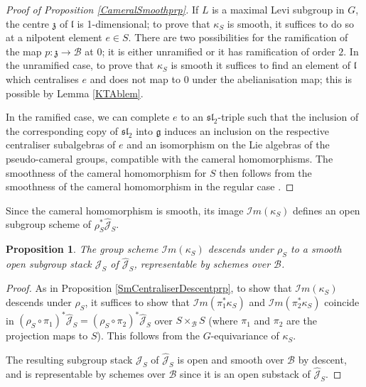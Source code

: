 \documentclass{amsart}
\newtheorem{proposition}[theorem]{Proposition}
\theoremstyle{remark}
\numberwithin{theorem}{section}
\numberwithin{equation}{section}
\begin{document}
\begin{proof}[Proof of Proposition \ref{CameralSmoothprp}]
If $L$ is a maximal Levi subgroup in $G$, the centre $\mathfrak{z}$ of $\mathfrak{l}$ is 1-dimensional; to prove that $\kappa_S$ is smooth, it suffices to do so at a nilpotent element $e \in S$. There are two possibilities for the ramification of the map $p:\mathfrak{z} \rightarrow \mathcal B$ at $0$; it is either unramified or it has ramification of order $2$. In the unramified case, to prove that $\kappa_S$ is smooth it suffices to find an element of $\mathfrak{l}$ which centralises $e$ and does not map to $0$ under the abelianisation map; this is possible by Lemma \ref{KTAblem}. 

In the ramified case, we can complete $e$ to an $\mathfrak{sl}_2$-triple such that the inclusion of the corresponding copy of $\mathfrak{sl}_2$ into $\mathfrak{g}$ induces an inclusion on the respective centraliser subalgebras of $e$ and an isomorphism on the Lie algebras of the pseudo-cameral groups, compatible with the cameral homomorphisms. The smoothness of the cameral homomorphism for $S$ then follows from the smoothness of the cameral homomorphism in the regular case \cite[Proposition 12.5]{DG}.
\end{proof}

Since the cameral homomorphism is smooth, its image $\mathcal {I}m(\kappa_S)$ defines an open subgroup scheme of $\rho_S^*\hat{\mathcal J}_S$.

\begin{proposition}\label{CameralDescentprp}
    The group scheme $\mathcal{I}m(\kappa_S)$ descends under $\rho_S$ to a smooth open subgroup stack $\mathcal J_S$ of $\hat{\mathcal J}_S$, representable by schemes over $\mathcal B$.
\end{proposition}

\begin{proof}
As in Proposition \ref{SmCentraliserDescentprp}, to show that $\mathcal I m(\kappa_S)$ descends under $\rho_S$, it suffices to show that $\mathcal I m(\pi_1^*\kappa_S)$ and $\mathcal I m(\pi_2^*\kappa_S)$ coincide in $(\rho_S \circ \pi_1)^*\hat{\mathcal J}_S =(\rho_S \circ \pi_2)^*\hat{\mathcal J}_S$ over $S \times_{\mathcal B} S$ (where $\pi_1$ and $\pi_2$ are the projection maps to $S$). This follows from the $G$-equivariance of $\kappa_S$.

The resulting subgroup stack $\mathcal J_S$ of $\hat{\mathcal J}_S$ is open and smooth over $\mathcal B$ by descent, and is representable by schemes over $\mathcal B$ since it is an open substack of $\hat{\mathcal J}_S$.
\end{proof}
\end{document}
